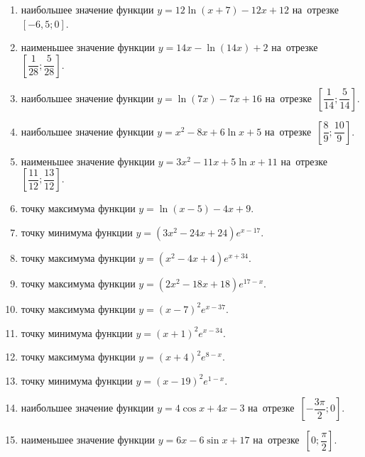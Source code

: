 \documentclass[a4paper,10pt]{article}
\begin{document}
\begin{enumerate}
\item {} наибольшее значение функции $y = 12\ln \left(x+7\right)-12x +12$ на~отрезке~$\left[-6,5;0\right]$.

\item {} наименьшее значение функции $y = 14x-\ln \left(14x\right)+2$ на~отрезке~$\left[\dfrac{1}{28};\dfrac{5}{28}\right]$.

\item {} наибольшее значение функции $y = \ln \left(7x\right)-7x+16$ на~отрезке~$\left[\dfrac{1}{14};\dfrac{5}{14}\right]$.

\item {} наибольшее значение функции $y=x^2-8x+6\ln x+5$ на~отрезке~$\left[\dfrac{8}{9};\dfrac{10}{9}\right]$.

\item {} наименьшее значение функции $y=3x^2-11x+5\ln x+11$ на~отрезке~$\left[\dfrac{11}{12};\dfrac{13}{12}\right]$.

\item {} точку максимума функции $y=\ln \left(x-5\right)-4x+9$.

\item {} точку минимума функции $y=\left(3x^2-24x+24\right)e^{x-17}$.

\item {} точку максимума функции $y=\left(x^2-4x+4\right)e^{x+34}$.

\item {} точку максимума функции $y=\left(2x^2-18x+18\right)e^{17-x}$.

\item {} точку максимума функции $y=\left(x -7\right)^2e^{x-37}$.

\item {} точку минимума функции $y=\left(x +1\right)^2e^{x-34}$.

\item {} точку максимума функции $y=\left(x +4\right)^2e^{8-x}$.

\item {} точку минимума функции $y=\left(x -19\right)^2e^{1-x}$.

\item {} наибольшее значение функции $y=4\cos x+4x -3$ на~отрезке~$\left[-\dfrac{3\pi }{2};0\right]$.

\item {} наименьшее значение функции $y=6x-6\sin x +17$ на~отрезке~$\left[0;\dfrac{\pi }{2}\right]$.


\end{enumerate}
\end{document}
